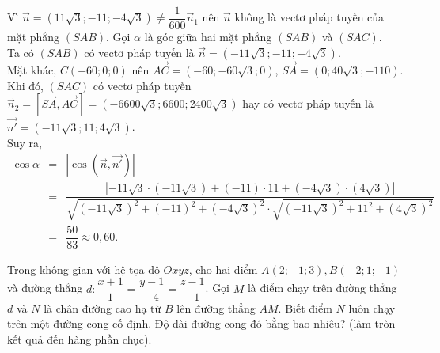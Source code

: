 \begin{ex}
{\begin{itemchoice}
		Vì $\overrightarrow{n}=\left(11\sqrt{3};-11;-4\sqrt{3}\right)\neq \dfrac{1}{600}\overrightarrow{n}_1$ nên $\overrightarrow{n}$ không là vectơ pháp tuyến của mặt phẳng $(SAB)$.
		\itemch Gọi $\alpha$ là góc giữa hai mặt phẳng $(SAB)$ và $(SAC)$.\\
		Ta có $(SAB)$ có vectơ pháp tuyến là $\overrightarrow{n}=\left(-11\sqrt{3};-11;-4\sqrt{3}\right)$.\\
		Mặt khác, $C\left(-60;0;0\right)$ nên $\overrightarrow{AC}=\left(-60;-60\sqrt{3};0\right)$, $\overrightarrow{SA}=\left(0;40\sqrt{3};-110\right)$.\\
		Khi đó, $(SAC)$ có vectơ pháp tuyến $\overrightarrow{n}_2=\left[\overrightarrow{SA},\overrightarrow{AC}\right]=\left(-6600\sqrt{3};6600;2400\sqrt{3}\right)$ hay có vectơ pháp tuyến là $\overrightarrow{n'}=\left(-11\sqrt{3};11;4\sqrt{3}\right)$.\\
		Suy ra, \begin{eqnarray*}
			\cos\alpha&=&\left|\cos\left(\overrightarrow{n},\overrightarrow{n'}\right)\right|\\&=&\dfrac{\left|-11\sqrt{3}\cdot (-11\sqrt{3})+(-11)\cdot11+(-4\sqrt{3})\cdot(4\sqrt{3})\right|}{\sqrt{(-11\sqrt{3})^2+(-11)^2+(-4\sqrt{3})^2}\cdot\sqrt{(-11\sqrt{3})^2+11^2+(4\sqrt{3})^2}}\\
			&=&\dfrac{50}{83}\approx 0,60.
		\end{eqnarray*}
	\end{itemchoice}}
\end{ex}

\begin{ex}%
	Trong không gian với hệ tọa độ $O x y z$, cho hai điểm $A(2 ;-1 ; 3), B(-2 ; 1 ;-1)$ và đường thẳng $d\colon \dfrac{x+1}{1}=\dfrac{y-1}{-4}=\dfrac{z-1}{-1}$. Gọi $M$ là điểm chạy trên đường thẳng $d$ và $N$ là chân đường cao hạ từ $B$ lên đường thẳng $A M$. Biết điểm $N$ luôn chạy trên một đường cong cố định. Độ dài đường cong đó bằng bao nhiêu? (làm tròn kết quả đến hàng phần chục).
\end{ex}

